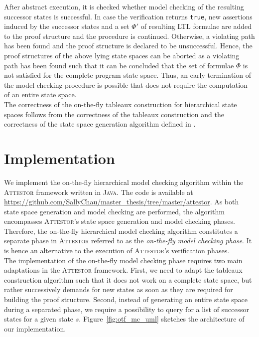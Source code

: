 \documentclass[a4paper, 12pt, twoside]{report}
\begin{document}
	After abstract execution, it is checked whether model checking of the resulting successor states is successful. In case the verification returns \texttt{true}, new assertions induced by the successor states and a set $\Phi'$ of resulting LTL formulae are added to the proof structure and the procedure is continued. Otherwise, a violating path has been found and the proof structure is declared to be unsuccessful. Hence, the proof structures of the above lying state spaces can be aborted as a violating path has been found such that it can be concluded that the set of formulae $\Phi$ is not satisfied for the complete program state space. Thus, an early termination of the model checking procedure is possible that does not require the computation of an entire state space. \\

	The correctness of the on-the-fly tableaux construction for hierarchical state spaces follows from the correctness of the tableaux construction \cite{bhat1995efficient} and the correctness of the state space generation algorithm defined in \cite{arndt2018let}. 
	
	\section{Implementation}
	
	We implement the on-the-fly hierarchical model checking algorithm within the \textsc{Attestor} framework written in \textsc{Java}. The code is available at \url{https://github.com/SallyChau/master_thesis/tree/master/attestor}. As both state space generation and model checking are performed, the algorithm encompasses \textsc{Attestor}'s state space generation and model checking phases. Therefore, the on-the-fly hierarchical model checking algorithm constitutes a separate phase in \textsc{Attestor} referred to as the \textit{on-the-fly model checking phase}. It is hence an alternative to the execution of \textsc{Attestor}'s verification phases.\\
	
	The implementation of the on-the-fly model checking phase requires two main adaptations in the \textsc{Attestor} framework. First, we need to adapt the tableaux construction algorithm such that it does not work on a complete state space, but rather successively demands for new states as soon as they are required for building the proof structure. Second, instead of generating an entire state space during a separated phase, we require a possibility to query for a list of successor states for a given state $s$. Figure~\ref{fig:otf_mc_uml} sketches the architecture of our implementation.\\
	
\end{document}
